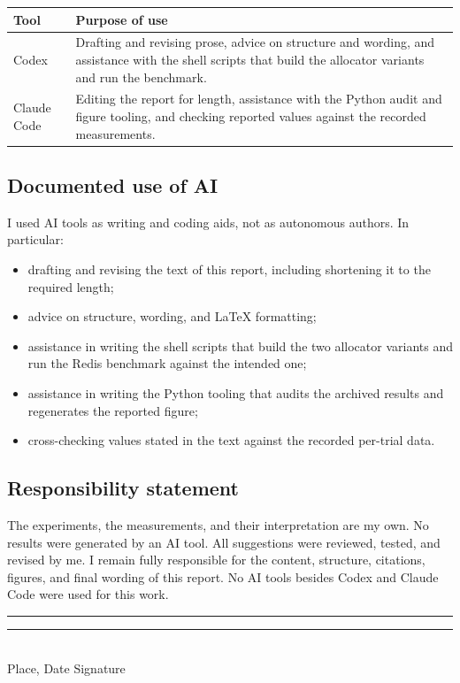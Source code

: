 \documentclass[sigconf]{acmart}
\begin{document}
\begin{table}[h]
\centering
\footnotesize
\begin{tabular}{p{}p{}}
\hline
\textbf{Tool} & \textbf{Purpose of use} \\
\hline
Codex & Drafting and revising prose, advice on structure and wording, and
assistance with the shell scripts that build the allocator variants and run
the benchmark. \\
\hline
Claude Code & Editing the report for length, assistance with the Python audit
and figure tooling, and checking reported values against the recorded
measurements. \\
\hline
\end{tabular}
\end{table}

\subsection*{Documented use of AI}

I used AI tools as writing and coding aids, not as autonomous authors. In
particular:

\begin{itemize}
\item drafting and revising the text of this report, including shortening it
      to the required length;
\item advice on structure, wording, and LaTeX formatting;
\item assistance in writing the shell scripts that build the two allocator
      variants and run the Redis benchmark against the intended one;
\item assistance in writing the Python tooling that audits the archived
      results and regenerates the reported figure;
\item cross-checking values stated in the text against the recorded per-trial
      data.
\end{itemize}

\subsection*{Responsibility statement}

The experiments, the measurements, and their interpretation are my own. No
results were generated by an AI tool. All suggestions were reviewed, tested,
and revised by me. I remain fully responsible for the content, structure,
citations, figures, and final wording of this report. No AI tools besides
Codex and Claude Code were used for this work.

\vspace{1cm}

\noindent \rule{3.4cm}{0.4pt} \hfill \rule{3.4cm}{0.4pt} \\
Place, Date \hfill Signature



\end{document}
